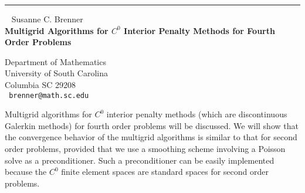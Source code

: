 \documentclass{report}
\begin{document}
\begin{center}

\rule{6in}{1pt} \
{\large
Susanne C. Brenner
\\ {\bf
Multigrid Algorithms for $C^0$ Interior Penalty Methods for Fourth Order
Problems
}}

Department of Mathematics
\\
University of South Carolina
\\
Columbia SC 29208
\\ {\tt
brenner@math.sc.edu
}
\end{center}

Multigrid algorithms for $C^0$ interior penalty methods (which are
discontinuous Galerkin methods) for fourth order problems will be
discussed. We will show that the convergence behavior of the multigrid
algorithms is similar to that for second order problems, provided that
we use a smoothing scheme involving a Poisson solve as a
preconditioner. Such a preconditioner can be easily implemented because
the $C^0$ finite element spaces are standard spaces for second order
problems.
\end{document}
